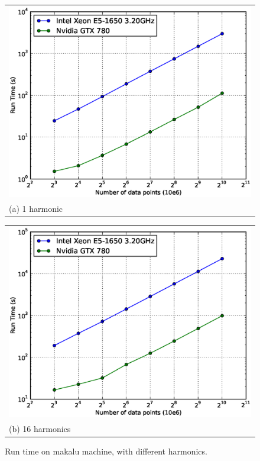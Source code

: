 \documentclass[preprint2]{aastex}
\begin{document}
\begin{figure}
  \centering
  \begin{tabular}[b]{@{}p{}@{}}
    \centering\includegraphics[width=1.0\linewidth]{fig/makalu_runtime_overview_1_harm.eps} \\
    \centering\small (a) 1 harmonic
  \end{tabular}%
  \quad
  \begin{tabular}[b]{@{}p{}@{}}
    \centering\includegraphics[width=1.0\linewidth]{fig/makalu_runtime_overview_16_harm.eps} \\
    \centering\small (b) 16 harmonics
  \end{tabular}
\caption{Run time on makalu machine, with different harmonics.}
\label{fig:runtime}
\end{figure}
\end{document}
